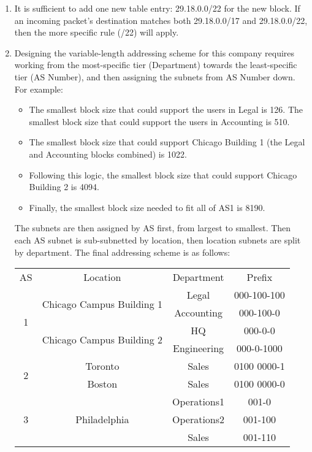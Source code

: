 \documentclass{article}
\begin{document}
\begin{enumerate}
\item It is sufficient to add one new table entry: 29.18.0.0/22 for the new block. If an incoming packet's destination matches both 29.18.0.0/17 and 29.18.0.0/22, then the more specific rule (/22) will apply.

\item Designing the variable-length addressing scheme for this company requires working from the most-specific tier (Department) towards the least-specific tier (AS Number), and then assigning the subnets from AS Number down. For example:
\begin{itemize}
\item The smallest block size that could support the users in Legal is 126. The smallest block size that could support the users in Accounting is 510.
\item The smallest block size that could support Chicago Building 1 (the Legal and Accounting blocks combined) is 1022.
\item Following this logic, the smallest block size that could support Chicago Building 2 is 4094.
\item Finally, the smallest block size needed to fit all of AS1 is 8190.
\end{itemize}

The subnets are then assigned by AS first, from largest to smallest. Then each AS subnet is sub-subnetted by location, then location subnets are split by department. The final addressing scheme is as follows:
\begin{center}
\begin{tabularx}{\textwidth}{ |c|c|c|c| }
    \cline{1-4}
    AS & Location & Department & Prefix \\ \cline{1-4}
    \multirow{4}{*}{1} & \multirow{2}{*}{Chicago Campus Building 1} & Legal & 000-100-100 \\ \cline{3-4}
    & & Accounting & 000-100-0 \\ \cline{2-4}
    & \multirow{2}{*}{Chicago Campus Building 2} & HQ & 000-0-0 \\ \cline{3-4}
    & & Engineering & 000-0-1000 \\ \cline{1-4}
    \multirow{2}{*}{2} & Toronto & Sales & 0100 0000-1 \\ \cline{2-4}
    & Boston & Sales & 0100 0000-0 \\ \cline{1-4}
    \multirow{3}{*}{3} & \multirow{3}{*}{Philadelphia} & Operations1 & 001-0 \\ \cline{3-4}
    & & Operations2 & 001-100 \\ \cline{3-4}
    & & Sales & 001-110 \\ \cline{1-4}
\end{tabularx}
\end{center}


\end{enumerate}
\end{document}
